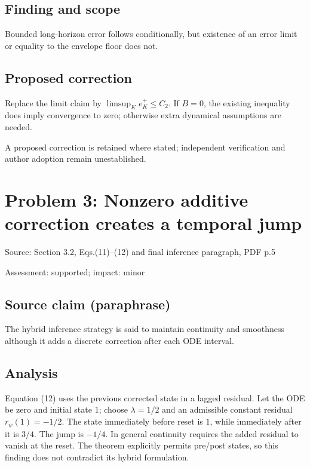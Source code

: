 \documentclass[11pt]{article}
\begin{document}
\subsection*{Finding and scope}

Bounded long-horizon error follows conditionally, but existence of an error limit or equality to the envelope floor does not.

\subsection*{Proposed correction}

Replace the limit claim by \(\limsup_K e_K^+\le C_2\). If \(B=0\), the existing inequality does imply convergence to zero; otherwise extra dynamical assumptions are needed.

A proposed correction is retained where stated; independent verification and author adoption remain unestablished.

\section*{Problem 3: Nonzero additive correction creates a temporal jump}

Source: Section 3.2, Eqs.(11)–(12) and final inference paragraph, PDF p.5

Assessment: supported; impact: minor

\subsection*{Source claim (paraphrase)}

The hybrid inference strategy is said to maintain continuity and smoothness although it adds a discrete correction after each ODE interval.

\subsection*{Analysis}

Equation (12) uses the previous corrected state in a lagged residual. Let the ODE be zero and initial state \(1\); choose \(\lambda=1/2\) and an admissible constant residual \(r_\psi(1)=-1/2\). The state immediately before reset is \(1\), while immediately after it is \(3/4\). The jump is \(-1/4\). In general continuity requires the added residual to vanish at the reset. The theorem explicitly permits pre/post states, so this finding does not contradict its hybrid formulation.
\end{document}
